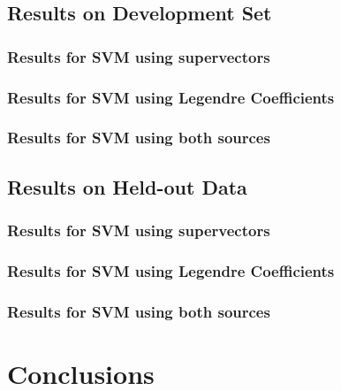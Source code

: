 \documentclass[11pt,a4paper]{tesis}
\begin{document}
	\section{Results on Development Set}
		\subsection{Results for SVM using supervectors}
		\subsection{Results for SVM using Legendre Coefficients}
		\subsection{Results for SVM using both sources}
	\section{Results on Held-out Data}
		\subsection{Results for SVM using supervectors}
		\subsection{Results for SVM using Legendre Coefficients}
		\subsection{Results for SVM using both sources}
\chapter{Conclusions}
 
\end{document}
